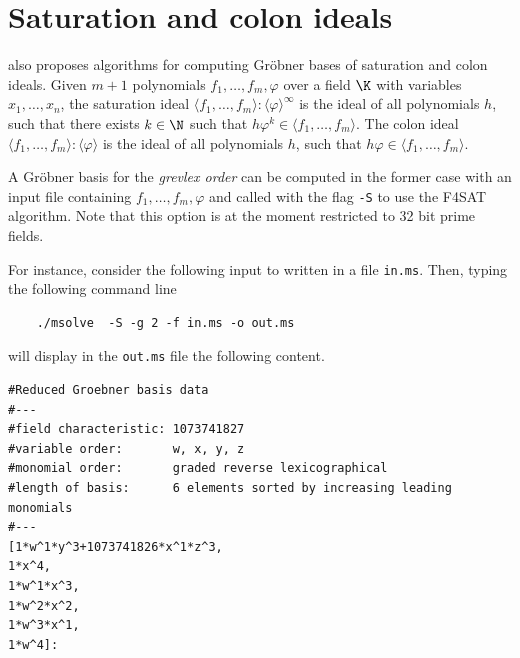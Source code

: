 \documentclass[a4paper,english,11pt]{scrartcl}
\theoremstyle{definition}
\theoremstyle{remark}
\begin{document}
\section{Saturation and colon ideals}\label{sec:f4sat}
\msolve also proposes algorithms for computing Gr\"obner bases of
saturation and colon ideals. Given $m+1$ polynomials
$f_1,\ldots,f_m,\varphi$ over a field $\K$ with variables
$x_1,\ldots,x_n$,
the saturation ideal
$\langle f_1,\ldots,f_m\rangle:\langle \varphi\rangle^{\infty}$ is the ideal of all
polynomials $h$, such that there exists $k\in\N$ such that
$h \varphi^k\in\langle f_1,\ldots,f_m\rangle$.
The colon ideal
$\langle f_1,\ldots,f_m\rangle:\langle \varphi\rangle$ is the ideal of all
polynomials $h$, such that
$h \varphi\in\langle f_1,\ldots,f_m\rangle$.

A Gr\"obner basis for the \emph{grevlex order} can be computed in the
former case with an input file containing $f_1,\ldots,f_m,\varphi$ and
called with the flag \verb+-S+ to use the F4SAT algorithm. Note that this option
is at the moment restricted to 32 bit prime fields.

For instance, consider the following input to \msolve written in a file
\verb+in.ms+.
Then, typing the following command line
\begin{tcolorbox} %
  \begin{verbatim}
    ./msolve  -S -g 2 -f in.ms -o out.ms
  \end{verbatim}
\end{tcolorbox}
will display in the \verb+out.ms+ file the following content.
\begin{tcolorbox}
  \begin{lstlisting}
#Reduced Groebner basis data
#---
#field characteristic: 1073741827
#variable order:       w, x, y, z
#monomial order:       graded reverse lexicographical
#length of basis:      6 elements sorted by increasing leading monomials
#---
[1*w^1*y^3+1073741826*x^1*z^3,
1*x^4,
1*w^1*x^3,
1*w^2*x^2,
1*w^3*x^1,
1*w^4]:
  \end{lstlisting}
\end{tcolorbox}



\end{document}
